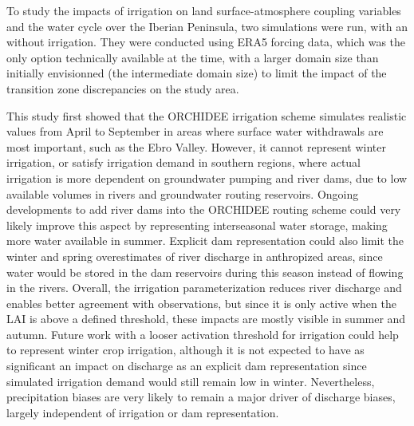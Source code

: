 \hfill

To study the impacts of irrigation on land surface-atmosphere coupling variables and the water cycle over the Iberian Peninsula, two simulations were run, with an without irrigation. They were conducted using ERA5 forcing data, which was the only option technically available at the time, with a larger domain size than initially envisionned (the intermediate domain size) to limit the impact of the transition zone discrepancies on the study area.

This study first showed that the ORCHIDEE irrigation scheme simulates realistic values from April to September in areas where surface water withdrawals are most important, such as the Ebro Valley. However, it cannot represent winter irrigation, or satisfy irrigation demand in southern regions, where actual irrigation is more dependent on groundwater pumping and river dams, due to low available volumes in rivers and groundwater routing reservoirs. Ongoing developments to add river dams into the ORCHIDEE routing scheme \citep{baratgin_modeling_2024} could very likely improve this aspect by representing interseasonal water storage, making more water available in summer.
Explicit dam representation could also limit the winter and spring overestimates of river discharge in anthropized areas, since water would be stored in the dam reservoirs during this season instead of flowing in the rivers. 
Overall, the irrigation parameterization reduces river discharge and enables better agreement with observations, but since it is only active when the LAI is above a defined threshold, these impacts are mostly visible in summer and autumn. Future work with a looser activation threshold for irrigation could help to represent winter crop irrigation, although it is not expected to have as significant an impact on discharge as an explicit dam representation since simulated irrigation demand would still remain low in winter. Nevertheless, precipitation biases are very likely to remain a major driver of discharge biases, largely independent of irrigation or dam representation.

